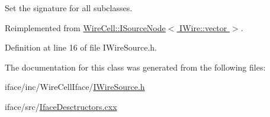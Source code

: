 Set the signature for all subclasses. 



Reimplemented from \hyperlink{class_wire_cell_1_1_i_source_node_a9361f7cad35e087800c5e59f27939977}{Wire\+Cell\+::\+I\+Source\+Node$<$ I\+Wire\+::vector $>$}.



Definition at line 16 of file I\+Wire\+Source.\+h.



The documentation for this class was generated from the following files\+:\begin{DoxyCompactItemize}
\item 
iface/inc/\+Wire\+Cell\+Iface/\hyperlink{_i_wire_source_8h}{I\+Wire\+Source.\+h}\item 
iface/src/\hyperlink{_iface_desctructors_8cxx}{Iface\+Desctructors.\+cxx}\end{DoxyCompactItemize}
